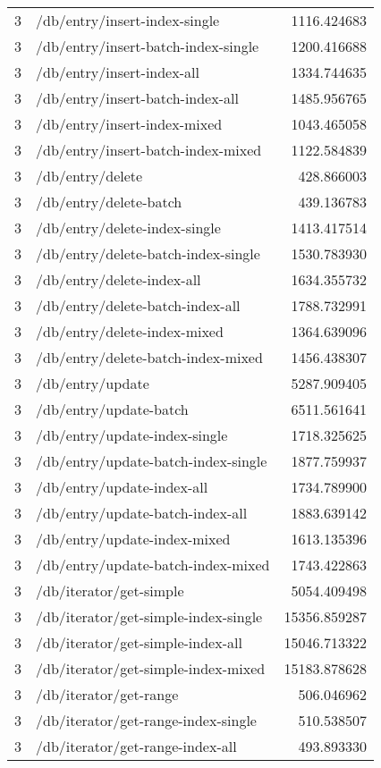 \begin{longtable}{rlr}
3 & /db/entry/insert-index-single & 1116.424683 \\
3 & /db/entry/insert-batch-index-single & 1200.416688 \\
3 & /db/entry/insert-index-all & 1334.744635 \\
3 & /db/entry/insert-batch-index-all & 1485.956765 \\
3 & /db/entry/insert-index-mixed & 1043.465058 \\
3 & /db/entry/insert-batch-index-mixed & 1122.584839 \\
3 & /db/entry/delete & 428.866003 \\
3 & /db/entry/delete-batch & 439.136783 \\
3 & /db/entry/delete-index-single & 1413.417514 \\
3 & /db/entry/delete-batch-index-single & 1530.783930 \\
3 & /db/entry/delete-index-all & 1634.355732 \\
3 & /db/entry/delete-batch-index-all & 1788.732991 \\
3 & /db/entry/delete-index-mixed & 1364.639096 \\
3 & /db/entry/delete-batch-index-mixed & 1456.438307 \\
3 & /db/entry/update & 5287.909405 \\
3 & /db/entry/update-batch & 6511.561641 \\
3 & /db/entry/update-index-single & 1718.325625 \\
3 & /db/entry/update-batch-index-single & 1877.759937 \\
3 & /db/entry/update-index-all & 1734.789900 \\
3 & /db/entry/update-batch-index-all & 1883.639142 \\
3 & /db/entry/update-index-mixed & 1613.135396 \\
3 & /db/entry/update-batch-index-mixed & 1743.422863 \\
3 & /db/iterator/get-simple & 5054.409498 \\
3 & /db/iterator/get-simple-index-single & 15356.859287 \\
3 & /db/iterator/get-simple-index-all & 15046.713322 \\
3 & /db/iterator/get-simple-index-mixed & 15183.878628 \\
3 & /db/iterator/get-range & 506.046962 \\
3 & /db/iterator/get-range-index-single & 510.538507 \\
3 & /db/iterator/get-range-index-all & 493.893330 \\

\end{longtable}
